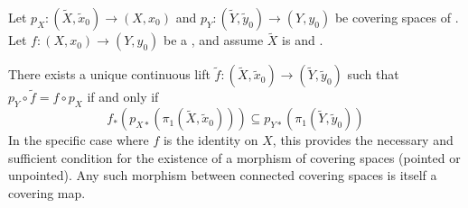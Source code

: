 \begin{theorem} \label{theorem:lift_for_a_map_of_pointed_spaces_to_a_map_of_covers_exists_iff_images_of_fundamental_groups_are_contained}
Let $p_X: (\tilde{X}, \tilde{x}_0) \to (X, x_0)$ and $p_Y: (\tilde{Y}, \tilde{y}_0) \to (Y, y_0)$ be covering spaces of . Let $f: (X, x_0) \to (Y, y_0)$ be a , and assume $\tilde{X}$ is  and . 

There exists a unique continuous lift $\tilde{f}: (\tilde{X}, \tilde{x}_0) \to (\tilde{Y}, \tilde{y}_0)$ such that $p_Y \circ \tilde{f} = f \circ p_X$ if and only if 
$$f_*(p_{X*}(\pi_1(\tilde{X}, \tilde{x}_0))) \subseteq p_{Y*}(\pi_1(\tilde{Y}, \tilde{y}_0))$$
In the specific case where $f$ is the identity on $X$, this provides the necessary and sufficient condition for the existence of a morphism of covering spaces (pointed or unpointed). Any such morphism between connected covering spaces is itself a covering map.
\end{theorem}